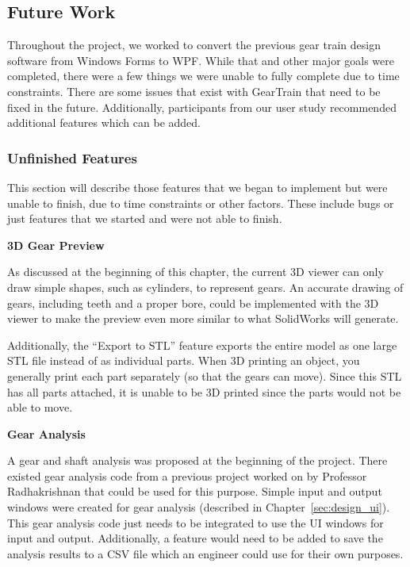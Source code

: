 \begin{doublespace}
\subsection{Future Work}
\label{sec:futurework}
Throughout the project, we worked to convert the previous gear train design software from Windows Forms to WPF. While that and other major goals were completed, there were a few things we were unable to fully complete due to time constraints. There are some issues that exist with GearTrain that need to be fixed in the future. Additionally, participants from our user study recommended additional features which can be added.

\subsubsection{Unfinished Features}
This section will describe those features that we began to implement but were unable to finish, due to time constraints or other factors. These include bugs or just features that we started and were not able to finish.

\noindent\textbf{3D Gear Preview}

\noindent As discussed at the beginning of this chapter, the current 3D viewer can only draw simple shapes, such as cylinders, to represent gears. An accurate drawing of gears, including teeth and a proper bore, could be implemented with the 3D viewer to make the preview even more similar to what SolidWorks will generate.

Additionally, the ``Export to STL'' feature exports the entire model as one large STL file instead of as individual parts. When 3D printing an object, you generally print each part separately (so that the gears can move). Since this STL has all parts attached, it is unable to be 3D printed since the parts would not be able to move.

\noindent\textbf{Gear Analysis}

\noindent A gear and shaft analysis was proposed at the beginning of the project. There existed gear analysis code from a previous project worked on by Professor Radhakrishnan that could be used for this purpose. Simple input and output windows were created for gear analysis (described in Chapter~\ref{sec:design_ui}). This gear analysis code just needs to be integrated to use the UI windows for input and output. Additionally, a feature would need to be added to save the analysis results to a CSV file which an engineer could use for their own purposes.


\end{doublespace}
